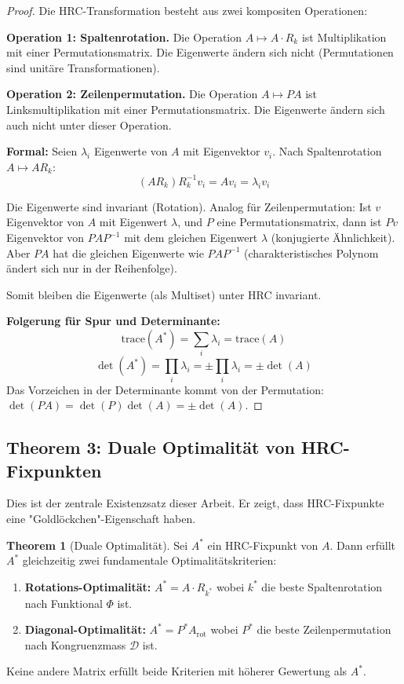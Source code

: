 \documentclass[a4paper,12pt]{article}
\theoremstyle{definition}
\newtheorem{theorem}{Theorem}
\begin{document}
\begin{proof}
Die HRC-Transformation besteht aus zwei kompositen Operationen:

\textbf{Operation 1: Spaltenrotation.} Die Operation $A \mapsto A \cdot R_k$ ist Multiplikation mit einer Permutationsmatrix. Die Eigenwerte ändern sich nicht (Permutationen sind unitäre Transformationen).

\textbf{Operation 2: Zeilenpermutation.} Die Operation $A \mapsto P A$ ist Linksmultiplikation mit einer Permutationsmatrix. Die Eigenwerte ändern sich auch nicht unter dieser Operation.

\textbf{Formal:} Seien $\lambda_i$ Eigenwerte von $A$ mit Eigenvektor $v_i$. Nach Spaltenrotation $A \mapsto AR_k$:
\[
(AR_k) R_k^{-1} v_i = A v_i = \lambda_i v_i
\]

Die Eigenwerte sind invariant (Rotation). Analog für Zeilenpermutation: Ist $v$ Eigenvektor von $A$ mit Eigenwert $\lambda$, und $P$ eine Permutationsmatrix, dann ist $Pv$ Eigenvektor von $PAP^{-1}$ mit dem gleichen Eigenwert $\lambda$ (konjugierte Ähnlichkeit). Aber $PA$ hat die gleichen Eigenwerte wie $PAP^{-1}$ (charakteristisches Polynom ändert sich nur in der Reihenfolge).

Somit bleiben die Eigenwerte (als Multiset) unter HRC invariant.

\textbf{Folgerung für Spur und Determinante:}
\[
\text{trace}(A^*) = \sum_i \lambda_i = \text{trace}(A)
\]
\[
\det(A^*) = \prod_i \lambda_i = \pm \prod_i \lambda_i = \pm \det(A)
\]
Das Vorzeichen in der Determinante kommt von der Permutation: $\det(PA) = \det(P) \det(A) = \pm \det(A)$.
\end{proof}

\subsection{Theorem 3: Duale Optimalität von HRC-Fixpunkten}

Dies ist der zentrale Existenzsatz dieser Arbeit. Er zeigt, dass HRC-Fixpunkte eine "Goldlöckchen"-Eigenschaft haben.

\begin{theorem}[Duale Optimalität]
\label{thm:dual_optimality}
Sei $A^*$ ein HRC-Fixpunkt von $A$. Dann erfüllt $A^*$ gleichzeitig zwei fundamentale Optimalitätskriterien:

\begin{enumerate}
	\item \textbf{Rotations-Optimalität:} $A^* = A \cdot R_{k^*}$ wobei $k^*$ die beste Spaltenrotation nach Funktional $\Phi$ ist.
	\item \textbf{Diagonal-Optimalität:} $A^* = P^* A_{\text{rot}}$ wobei $P^*$ die beste Zeilenpermutation nach Kongruenzmass $\mathcal{D}$ ist.
\end{enumerate}

Keine andere Matrix erfüllt beide Kriterien mit höherer Gewertung als $A^*$.
\end{theorem}
\end{document}
